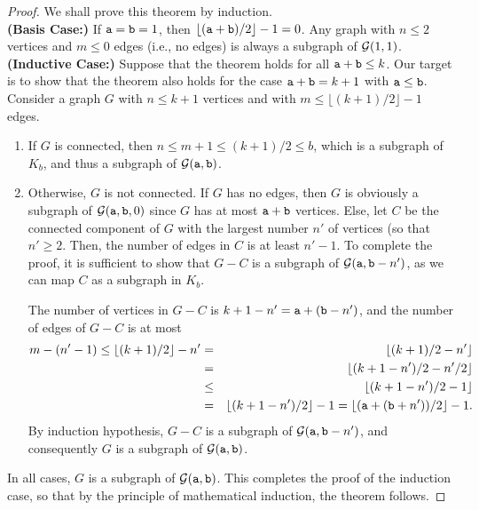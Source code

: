 \begin{proof}
We shall prove this theorem by induction.  \\

\noindent
{\bf (Basis Case:)} If $\mathtt{a} = \mathtt{b} =1$, then $\lfloor (\mathtt{a}+\mathtt{b})/2 \rfloor-1 = 0$. Any graph with $n \leq 2$ vertices and $m \leq 0$ edges (i.e., no edges) is always a subgraph of ${\cal G}(1,1)$.
\\

\noindent
{\bf (Inductive Case:)} Suppose that the theorem holds for all $\mathtt{a} + \mathtt{b} \leq k$.  Our target is to show that the theorem also holds for the case $\mathtt{a} + \mathtt{b} = k + 1$ with $\mathtt{a} \leq \mathtt{b}$.   Consider a graph $G$ with  $n \leq k+1$ vertices and with $m \leq \lfloor (k+1)/2 \rfloor -1$ edges. 

\begin{enumerate}
  \item If $G$ is connected, then $n \leq m + 1 \leq (k+1)/2 \leq b$, which is a subgraph of $K_b$, 
           and thus a subgraph of ${\cal G}(\mathtt{a},\mathtt{b})$.   

  \item Otherwise, $G$ is not connected.  If $G$ has no edges, then $G$ is obviously a subgraph of ${\cal G}(\mathtt{a},\mathtt{b},0)$ 
          since $G$ has at most $\mathtt{a}+\mathtt{b}$ vertices.
          Else, let $C$ be the connected component of $G$ with the largest number $n'$ of vertices (so that $n' \geq 2$.
          Then, the number of edges in $C$ is at least $n'-1$.  To complete the proof, it is sufficient to show 
          that $G - C$ is a subgraph of ${\cal G}(\mathtt{a}, \mathtt{b} - n')$, as we can map $C$ as a subgraph in $K_b$.

The number of vertices in $G-C$ is $k+1-n' = \mathtt{a} + (\mathtt{b}-n')$, and the number of edges of $G-C$ is at most 
\begin{eqnarray*}
m - (n'-1) \leq \lfloor(k+1)/2\rfloor - n' &=& \lfloor(k+1)/2 - n'\rfloor \\
&=& \lfloor (k+1-n')/2 - n'/2 \rfloor \\
&\leq& \lfloor (k+1-n')/2 - 1 \rfloor \\
&=& \lfloor(k+1-n')/2\rfloor - 1 = \lfloor (\mathtt{a} + (\mathtt{b}+n'))/2 \rfloor - 1.
\end{eqnarray*}
By induction hypothesis, $G-C$ is a subgraph of ${\cal G}(\mathtt{a}, \mathtt{b}-n')$, 
and consequently $G$ is a subgraph of ${\cal G}(\mathtt{a},\mathtt{b})$.
\end{enumerate}
In all cases, $G$ is a subgraph of ${\cal G}(\mathtt{a},\mathtt{b})$.  This completes the proof of the induction case, so that by the principle of mathematical induction, the theorem follows.
\end{proof}

